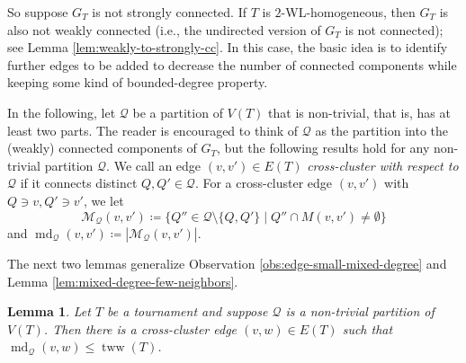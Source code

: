 \PassOptionsToPackage{dvipsnames,svgnames}{xcolor}\documentclass[10pt,a4paper]{article}
\newtheorem{lemma}{Lemma}[section]
\newcommand{\CM}{{\mathcal M}}
\newcommand{\CQ}{{\mathcal Q}}
\newcommand{\bigmid}{\;\big|\;}
\DeclareMathOperator{\md}{md}
\DeclareMathOperator{\tww}{tww}
\begin{document}
So suppose $G_T$ is not strongly connected.
If $T$ is $2$-WL-homogeneous, then $G_T$ is also not weakly connected (i.e., the undirected version of $G_T$ is not connected); see Lemma \ref{lem:weakly-to-strongly-cc}.
In this case, the basic idea is to identify further edges to be added to decrease the number of connected components while keeping some kind of bounded-degree property.

In the following, let $\CQ$ be a partition of $V(T)$ that is non-trivial, that is, has at least two parts.
The reader is encouraged to think of $\CQ$ as the partition into the (weakly) connected components of $G_T$, but the following results hold for any non-trivial partition $\CQ$.
We call an edge $(v,v') \in E(T)$ \emph{cross-cluster with respect to $\CQ$} if it connects distinct $Q,Q' \in \CQ$.
For a cross-cluster edge $(v,v')$ with $Q \owns v, Q'\owns v'$, we let
\[\CM_{\CQ}(v,v') \coloneqq \big\{ Q'' \in \CQ \setminus \{Q,Q'\} \bigmid Q'' \cap M(v,v') \neq \emptyset \big\}\]
and $\md_\CQ(v,v') \coloneqq |\CM_\CQ(v,v')|$.

The next two lemmas generalize Observation \ref{obs:edge-small-mixed-degree} and Lemma \ref{lem:mixed-degree-few-neighbors}.

\begin{lemma}
 \label{lem:edge-small-mixed-degree}
 Let $T$ be a tournament and suppose $\CQ$ is a non-trivial partition of $V(T)$.
 Then there is a cross-cluster edge $(v,w)\in E(T)$ such that $\md_\CQ(v,w) \leq \tww(T)$.
\end{lemma}
\end{document}

